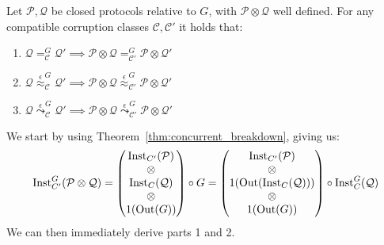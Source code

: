 \begin{theorem}
  Let $\mathcal{P}, \mathcal{Q}$ be closed protocols relative to $G$, with $\mathcal{P} \otimes \mathcal{Q}$
  well defined. For any compatible corruption classes $\mathcal{C}, \mathcal{C}'$
  it holds that:
  \begin{enumerate}
    \item $\mathcal{Q} =^G_{\mathcal{C}} \mathcal{Q}' \implies \mathcal{P} \otimes \mathcal{Q} =^G_{\mathcal{C}'} \mathcal{P} \otimes \mathcal{Q}'$
    \item $\mathcal{Q} \overset{\epsilon}{\approx}^G_{\mathcal{C}} \mathcal{Q}' \implies \mathcal{P} \otimes \mathcal{Q} \overset{\epsilon}{\approx}^G_{\mathcal{C}'} \mathcal{P} \otimes \mathcal{Q}'$
    \item $\mathcal{Q} \overset{\epsilon}{\leadsto}^G_{\mathcal{C}} \mathcal{Q}' \implies \mathcal{P} \otimes \mathcal{Q} \overset{\epsilon}{\leadsto}^G_{\mathcal{C}'} \mathcal{P} \otimes \mathcal{Q}'$
  \end{enumerate}

   We start by using Theorem~\ref{thm:concurrent_breakdown}, giving us:
  $$
  \text{Inst}^G_{C'}(\mathcal{P} \otimes \mathcal{Q})
  =
  \begin{pmatrix}
    \text{Inst}_{C'}(\mathcal{P})\cr
    \otimes\cr
    \text{Inst}_C(\mathcal{Q})\cr
    \otimes\cr
    1(\text{Out}(G))
  \end{pmatrix}
  \circ G
  =
  \begin{pmatrix}
    \text{Inst}_{C'}(\mathcal{P})\cr
    \otimes\cr
    1(\text{Out}(\text{Inst}_C(\mathcal{Q})))\cr
    \otimes\cr
    1(\text{Out}(G))
  \end{pmatrix}
  \circ
  \text{Inst}^G_C(\mathcal{Q})
  $$
  We can then immediately derive parts 1 and 2.


\end{theorem}

